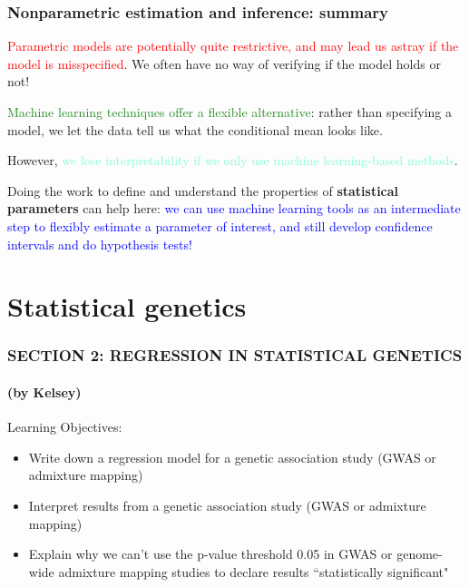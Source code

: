 \documentclass[12pt, 
hyperref={colorlinks=true, linkcolor=blue, urlcolor=cyan},dvipsnames]{beamer}
\begin{document}
\begin{frame}
\frametitle{Nonparametric estimation and inference: summary}

\textcolor{red}{Parametric models are potentially quite restrictive, and may lead us astray if the model is misspecified}. We often have no way of verifying if the model holds or not! \pause

\textcolor{ForestGreen}{Machine learning techniques offer a flexible alternative}: rather than specifying a model, we let the data tell us what the conditional mean looks like. \pause

However, \textcolor{Aquamarine}{we lose interpretability if we only use machine learning-based methods}. \pause

Doing the work to define and understand the properties of \textbf{statistical parameters} can help here: \textcolor{blue}{we can use machine learning tools as an intermediate step to flexibly estimate a parameter of interest, and still develop confidence intervals and do hypothesis tests! }
\end{frame}

\section{Statistical genetics}
\begin{frame}
\frametitle{SECTION 2: {\small REGRESSION IN STATISTICAL GENETICS}}
\framesubtitle{(by Kelsey)}

Learning Objectives:
\begin{itemize}
\item Write down a regression model for a genetic association study (GWAS or admixture mapping)
\item Interpret results from a genetic association study (GWAS or admixture mapping)
\item Explain why we can't use the p-value threshold 0.05 in GWAS or genome-wide admixture mapping studies to declare results ``statistically significant"
\end{itemize}

\end{frame}
\end{document}
